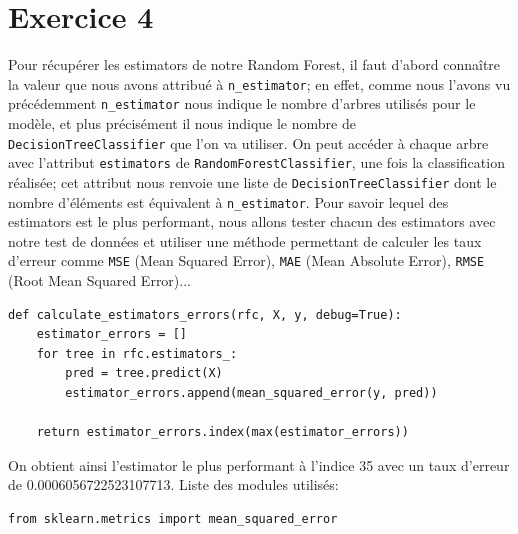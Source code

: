 \documentclass[a4paper, 12pt, oneside]{book}
\begin{document}
\section{Exercice 4}
Pour récupérer les estimators de notre Random Forest, il faut d'abord connaître la valeur que nous avons attribué à \texttt{n\_estimator}; en effet, comme nous l'avons vu précédemment \texttt{n\_estimator} nous indique le nombre d'arbres utilisés pour le modèle, et plus précisément il nous indique le nombre de \texttt{DecisionTreeClassifier} que l'on va utiliser. On peut accéder à chaque arbre avec l'attribut \texttt{estimators} de \texttt{RandomForestClassifier}, une fois la classification réalisée; cet attribut nous renvoie une liste de \texttt{DecisionTreeClassifier} dont le nombre d'éléments est équivalent à \texttt{n\_estimator}. Pour savoir lequel des estimators est le plus performant, nous allons tester chacun des estimators avec notre test de données et utiliser une méthode permettant de calculer les taux d'erreur comme \texttt{MSE} (Mean Squared Error), \texttt{MAE} (Mean Absolute Error), \texttt{RMSE} (Root Mean Squared Error)...
\begin{verbatim}
def calculate_estimators_errors(rfc, X, y, debug=True):
    estimator_errors = []
    for tree in rfc.estimators_:
        pred = tree.predict(X)
        estimator_errors.append(mean_squared_error(y, pred))

    return estimator_errors.index(max(estimator_errors))
\end{verbatim}
On obtient ainsi l'estimator le plus performant à l'indice 35 avec un taux d'erreur de 0.0006056722523107713.
\newline \newline
Liste des modules utilisés:
\begin{verbatim}
from sklearn.metrics import mean_squared_error
\end{verbatim}
\end{document}
